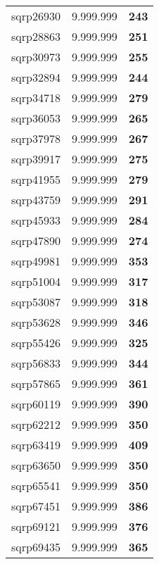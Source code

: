 \begin{tabular}{cc||c}
sqrp26930        & 9.999.999        & {\bf 243}       \\ 
sqrp28863        & 9.999.999        & {\bf 251}       \\ 
sqrp30973        & 9.999.999        & {\bf 255}       \\ 
sqrp32894        & 9.999.999        & {\bf 244}       \\ 
sqrp34718        & 9.999.999        & {\bf 279}       \\ 
sqrp36053        & 9.999.999        & {\bf 265}       \\ 
sqrp37978        & 9.999.999        & {\bf 267}       \\ 
sqrp39917        & 9.999.999        & {\bf 275}       \\ 
sqrp41955        & 9.999.999        & {\bf 279}       \\ 
sqrp43759        & 9.999.999        & {\bf 291}       \\ 
sqrp45933        & 9.999.999        & {\bf 284}       \\ 
sqrp47890        & 9.999.999        & {\bf 274}       \\ 
sqrp49981        & 9.999.999        & {\bf 353}       \\ 
sqrp51004        & 9.999.999        & {\bf 317}       \\ 
sqrp53087        & 9.999.999        & {\bf 318}       \\ 
sqrp53628        & 9.999.999        & {\bf 346}       \\ 
sqrp55426        & 9.999.999        & {\bf 325}       \\ 
sqrp56833        & 9.999.999        & {\bf 344}       \\ 
sqrp57865        & 9.999.999        & {\bf 361}       \\ 
sqrp60119        & 9.999.999        & {\bf 390}       \\ 
sqrp62212        & 9.999.999        & {\bf 350}       \\ 
sqrp63419        & 9.999.999        & {\bf 409}       \\ 
sqrp63650        & 9.999.999        & {\bf 350}       \\ 
sqrp65541        & 9.999.999        & {\bf 350}       \\ 
sqrp67451        & 9.999.999        & {\bf 386}       \\ 
sqrp69121        & 9.999.999        & {\bf 376}       \\ 
sqrp69435        & 9.999.999        & {\bf 365}       \\ 

\end{tabular}
